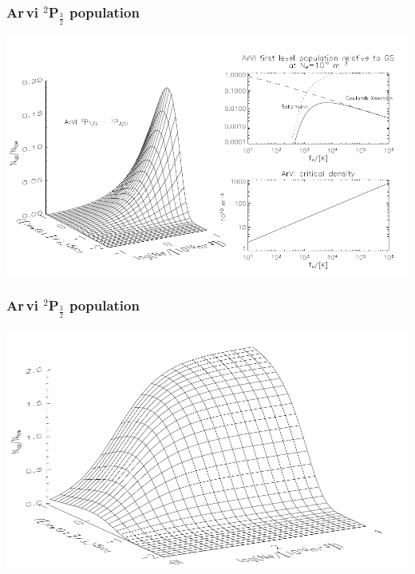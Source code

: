 \begin{frame}
\end{frame} \begin{frame}\frametitle{Ar\,{\sc vi}  $^2$P$_\frac{3}{2}$
  population}

\begin{center}
\includegraphics[width=\textwidth,height=!]{./B/ArVI_pop.pdf}
\end{center}

\end{frame} \begin{frame}\frametitle{ Ar\,{\sc vi}  $^2$P$_\frac{3}{2}$
  population}


\begin{center}
\includegraphics[width=\textwidth,height=!]{./B/ArVI_pop_xtd.pdf}
\end{center}



\end{frame}
